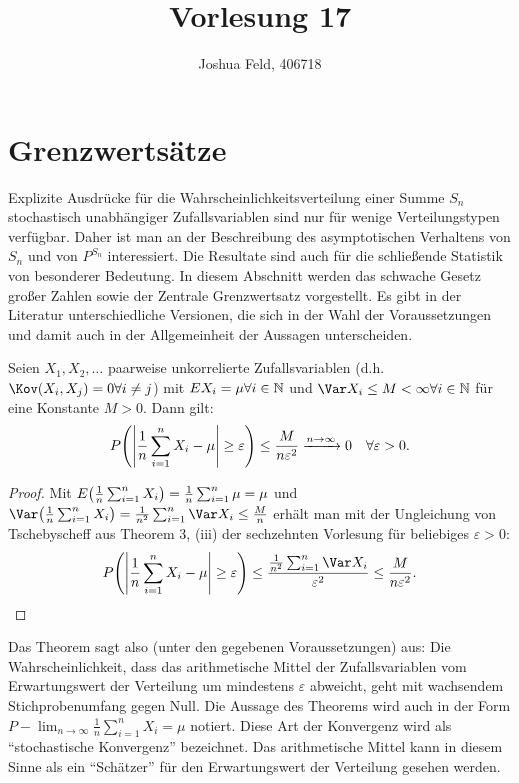 \documentclass{lecture}
\institute{Institut für Statistik und Wirtschaftsmathematik}
\title{Vorlesung 17}
\author{Joshua Feld, 406718}
\begin{document}
    \maketitle


    \section*{Grenzwertsätze}

    Explizite Ausdrücke für die Wahrscheinlichkeitsverteilung einer Summe \(S_n\) stochastisch unabhängiger Zufallsvariablen sind nur für wenige Verteilungstypen verfügbar.
    Daher ist man an der Beschreibung des asymptotischen Verhaltens von \(S_n\) und von \(P^{S_n}\) interessiert.
    Die Resultate sind auch für die schließende Statistik von besonderer Bedeutung.
    In diesem Abschnitt werden das schwache Gesetz großer Zahlen sowie der Zentrale Grenzwertsatz vorgestellt.
    Es gibt in der Literatur unterschiedliche Versionen, die sich in der Wahl der Voraussetzungen und damit auch in der Allgemeinheit der Aussagen unterscheiden.

    \begin{theorem}
        Seien \(X_1, X_2, \ldots\) paarweise unkorrelierte Zufallsvariablen (d.h. \(\Kov\parentheses*{X_i, X_j} = 0 \forall i \ne j\)) mit \(EX_i = \mu \forall i \in \mathbb{N}\) und \(\Var X_i \le M < \infty \forall i \in \N\) für eine Konstante \(M > 0\).
        Dann gilt:
        \[
            P\parentheses*{\absolute*{\frac{1}{n}\sum_{i = 1}^n X_i - \mu} \ge \varepsilon} \le \frac{M}{n\varepsilon^2} \xrightarrow{n \to \infty} 0 \quad \forall\varepsilon > 0.
        \]
    \end{theorem}

    \begin{proof}
        Mit \(E\parentheses*{\frac{1}{n}\sum_{i = 1}^n X_i} = \frac{1}{n}\sum_{i = 1}^n \mu = \mu\) und \(\Var\parentheses*{\frac{1}{n}\sum_{i = 1}^n X_i} = \frac{1}{n^2}\sum_{i = 1}^n \Var X_i \le \frac{M}{n}\) erhält man mit der Ungleichung von Tschebyscheff aus Theorem 3, (iii) der sechzehnten Vorlesung für beliebiges \(\varepsilon > 0\):
        \[
            P\parentheses*{\absolute*{\frac{1}{n}\sum_{i = 1}^n X_i - \mu} \ge \varepsilon} \le \frac{\frac{1}{n^2}\sum_{i = 1}^n \Var X_i}{\varepsilon^2} \le \frac{M}{n\varepsilon^2}.
        \]
    \end{proof}

    Das Theorem sagt also (unter den gegebenen Voraussetzungen) aus: Die Wahrscheinlichkeit, dass das arithmetische Mittel der Zufallsvariablen vom Erwartungswert der Verteilung um mindestens \(\varepsilon\) abweicht, geht mit wachsendem Stichprobenumfang gegen Null.
    Die Aussage des Theorems wird auch in der Form \(P - \lim_{n \to \infty}\frac{1}{n}\sum_{i = 1}^n X_i = \mu\) notiert.
    Diese Art der Konvergenz wird als ``stochastische Konvergenz'' bezeichnet.
    Das arithmetische Mittel kann in diesem Sinne als ein ``Schätzer'' für den Erwartungswert der Verteilung gesehen werden.
\end{document}

